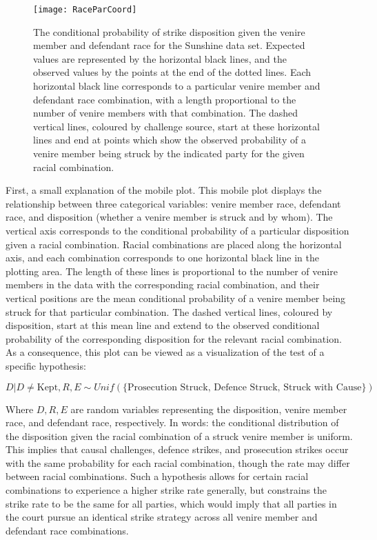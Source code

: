 \begin{figure}[!h]
  \centering
  \texttt{[image: RaceParCoord]}
  \caption[The ``Mobile Plot'' of Strikes by Racial Combination (Sunshine)]{\footnotesize The conditional probability of strike disposition given the
    venire member and defendant race for the Sunshine data set. Expected values are represented by the horizontal black lines, and the observed values
    by the points at the end of the dotted lines. Each horizontal black line corresponds to a particular venire member
    and defendant race combination, with a length proportional to the number of venire members with that combination. The dashed
    vertical lines, coloured by challenge source, start at these horizontal lines and end at points which show the observed
    probability of a venire member being struck by the indicated party for the given racial combination.}
  \label{fig:racedefmob}
\end{figure}

First, a small explanation of the mobile plot. This mobile plot displays the relationship between three categorical variables:
venire member race, defendant race, and disposition (whether a venire member is struck and by whom). The vertical axis corresponds
to the conditional probability of a particular disposition given a racial combination. Racial combinations
are placed along the horizontal axis, and each combination corresponds to one horizontal black line in the plotting area. The
length of these lines is proportional to the number of venire members in the data with the corresponding racial combination, and
their vertical positions are the mean conditional probability of a
venire member being struck for that particular combination. The dashed vertical lines, coloured by disposition, start at this mean line and
extend to the observed conditional probability of the corresponding disposition for the relevant racial combination. As a
consequence, this plot can be viewed as a visualization of the test of a specific hypothesis:

\begin{equation}
  \label{eq:vishyp}
  D | D \neq \text{Kept}, R, E \sim Unif(\{\text{Prosecution
    Struck, Defence Struck, Struck with Cause}\})
\end{equation}

Where $D, R, E$ are random variables representing the disposition, venire member race, and defendant race, respectively. In words: the conditional distribution of the
disposition given the racial combination of a struck venire member is uniform. This implies that causal challenges, defence strikes, and prosecution strikes occur with the same probability for each
racial combination, though the rate may differ between racial combinations. Such a hypothesis allows for certain racial
combinations to experience a higher strike rate generally, but constrains the strike rate to be the same for all parties, which
would imply that all parties in the court pursue an identical strike strategy across all venire member and defendant race
combinations.

